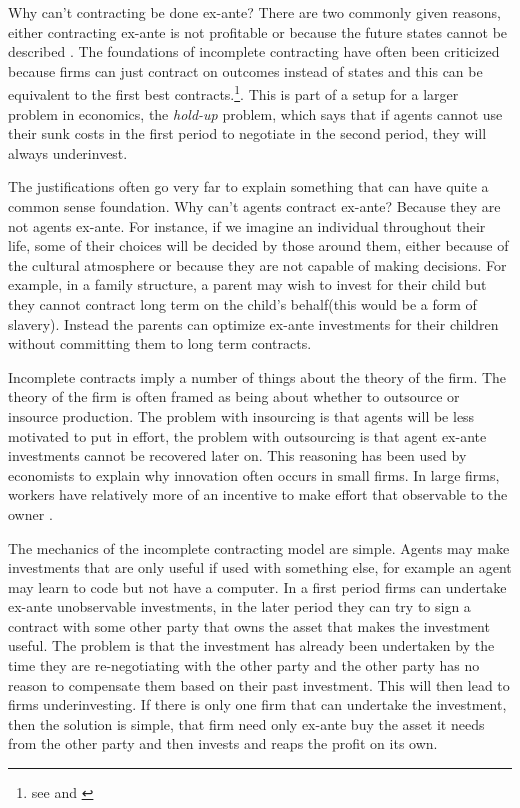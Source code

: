 \documentclass[12pt]{article}
\numberwithin{equation}{section}
\begin{document}
Why can't contracting be done ex-ante? There are two commonly given reasons, either contracting ex-ante is not profitable or because the future states cannot be described \citep{Hart1999}. The foundations of incomplete contracting have often been criticized because firms can just contract on outcomes instead of states and this can be equivalent to the first best contracts.\footnote{see \cite{Maskin2002} and \cite{maskin1999unforeseen}}. This is part of a setup for a larger problem in economics, the \textit{hold-up} problem, which says that if agents cannot use their sunk costs in the first period to negotiate in the second period, they will always underinvest.


The justifications often go very far to explain something that can have quite a common sense foundation. Why can't agents contract ex-ante? Because they are not agents ex-ante. For instance, if we imagine an individual throughout their life, some of their choices will be decided by those around them, either because of the cultural atmosphere or because they are not capable of making decisions. For example, in a family structure, a parent may wish to invest for their child but they cannot contract long term on the child's behalf(this would be a form of slavery). Instead the parents can optimize ex-ante investments for their children without committing them to long term contracts.

Incomplete contracts imply a number of things about the theory of the firm. The theory of the firm is often framed as being about whether to outsource or insource production. The problem with insourcing is that agents will be less motivated to put in effort, the problem with outsourcing is that agent ex-ante investments cannot be recovered later on. This reasoning has been used by economists to explain why innovation often occurs in small firms. In large firms, workers have relatively more of an incentive to make effort that observable to the owner \citep{Holmstrom1989}.


The mechanics of the incomplete contracting model are simple. Agents may make investments that are only useful if used with something else, for example an agent may learn to code but not have a computer. In a first period firms can undertake ex-ante unobservable investments, in the later period they can try to sign a contract with some other party that owns the asset that makes the investment useful. The problem is that the investment has already been undertaken by the time they are re-negotiating with the other party and the other party has no reason to compensate them based on their past investment. This will then lead to firms underinvesting. If there is only one firm that can undertake the investment, then the solution is simple, that firm need only ex-ante buy the asset it needs from the other party and then invests and reaps the profit on its own.
\end{document}
